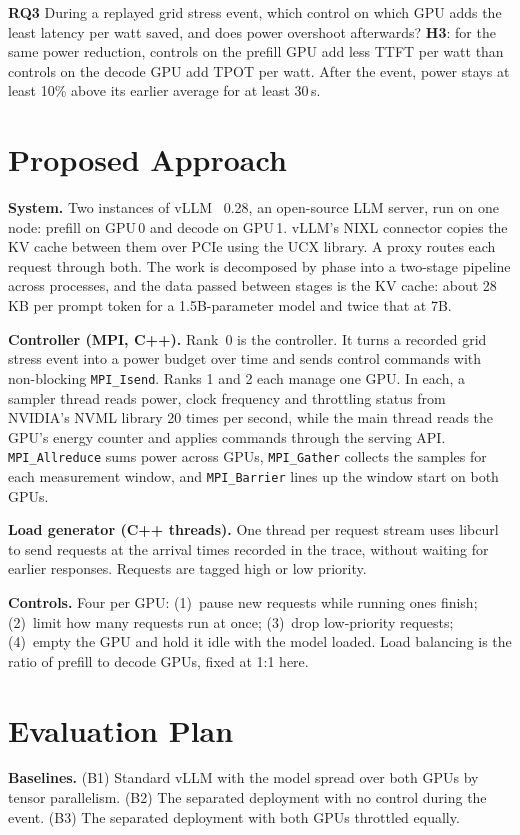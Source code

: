 \documentclass[conference,10pt]{IEEEtran}
\newcommand{\RQ}[1]{\textbf{RQ#1}}
\newcommand{\hy}[1]{\textbf{H#1}}
\begin{document}
\RQ{3} During a replayed grid stress event, which control on which GPU adds the least latency per watt saved, and does power overshoot afterwards? \hy{3}: for the same power reduction, controls on the prefill GPU add less TTFT per watt than controls on the decode GPU add TPOT per watt. After the event, power stays at least 10\% above its earlier average for at least 30\,s.

\section{Proposed Approach}
\textbf{System.} Two instances of vLLM~\cite{kwon2023vllm} 0.28, an open-source LLM server, run on one node: prefill on GPU\,0 and decode on GPU\,1. vLLM's NIXL connector copies the KV cache between them over PCIe using the UCX library. A proxy routes each request through both. The work is decomposed by phase into a two-stage pipeline across processes, and the data passed between stages is the KV cache: about 28\,KB per prompt token for a 1.5B-parameter model and twice that at 7B.

\textbf{Controller (MPI, C++).} Rank~0 is the controller. It turns a recorded grid stress event into a power budget over time and sends control commands with non-blocking \texttt{MPI\_Isend}. Ranks 1 and 2 each manage one GPU. In each, a sampler thread reads power, clock frequency and throttling status from NVIDIA's NVML library 20 times per second, while the main thread reads the GPU's energy counter and applies commands through the serving API. \texttt{MPI\_Allreduce} sums power across GPUs, \texttt{MPI\_Gather} collects the samples for each measurement window, and \texttt{MPI\_Barrier} lines up the window start on both GPUs.

\textbf{Load generator (C++ threads).} One thread per request stream uses libcurl to send requests at the arrival times recorded in the trace, without waiting for earlier responses. Requests are tagged high or low priority.

\textbf{Controls.} Four per GPU: (1)~pause new requests while running ones finish; (2)~limit how many requests run at once; (3)~drop low-priority requests; (4)~empty the GPU and hold it idle with the model loaded. Load balancing is the ratio of prefill to decode GPUs, fixed at 1:1 here.

\section{Evaluation Plan}
\textbf{Baselines.} (B1) Standard vLLM with the model spread over both GPUs by tensor parallelism. (B2) The separated deployment with no control during the event. (B3) The separated deployment with both GPUs throttled equally.
\end{document}
